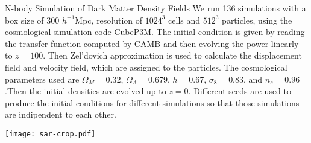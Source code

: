\begin{section}{N-body Simulation of Dark Matter Density Fields}
  \label{sec:simulation}
    We run 136 simulations with a box size of 300 $h^{-1}$Mpc, 
resolution of $1024^3$ cells and $512^3$ particles, using the cosmological 
simulation code CubeP3M\cite{bib:Harnois2013}. The initial condition is 
given by reading the transfer function computed by CAMB \cite{bib:Lewis2000} 
and then evolving the power linearly to $z=100$. Then Zel'dovich approximation 
is used to calculate the displacement field and velocity field, which are 
assigned to the particles. The cosmological parameters used are $\Omega_M=0.32$, 
$\Omega_{\Lambda}=0.679$, $h=0.67$, $\sigma_8=0.83$, and $n_s=0.96$.Then the 
initial densities are evolved up to $z=0$. Different seeds are used to produce 
the initial conditions for different simulations so that those simulations are 
indipendent to each other.
\begin{figure*}[t!]
\centering
 \texttt{[image: sar-crop.pdf]}
 \label{fig:simandrec}
   \caption{
2D projection of one
layer of the deformed grids of one out of 136 N-body simulations, and the density field 
on the selected deformed grids, with the magnitude as the number of particles per cell. 
The simulations hace 300 $h^{-1}$Mpc width box and $1024^3$ pixels.}
\end{figure*}

\end{section}

